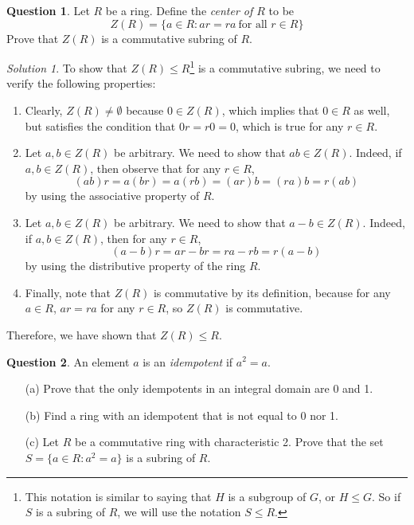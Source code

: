 \documentclass[11pt]{amsart}
\theoremstyle{definition}\newtheorem{question}{Question}
\theoremstyle{definition}\newtheorem{claim}{Claim}
\theoremstyle{remark}\newtheorem*{solution}{Solution}
\begin{document}
\newpage

\begin{question}
    Let $R$ be a ring. Define the \emph{center of $R$} to be
    \begin{equation*}
        Z(R) = \{a \in R : ar = ra \ \text{for all $r \in R$}\}
    \end{equation*}
    Prove that $Z(R)$ is a commutative subring of $R$.
\end{question}

\begin{solution}
    To show that $Z(R) \leq R$\footnote{This notation is similar to saying that $H$ is a subgroup of $G$, or $H \leq G$. So if $S$ is a subring of $R$, we will use the notation $S \leq R$.} is a commutative subring, we need to verify the following properties:
    \begin{enumerate}
        \item Clearly, $Z(R) \neq \emptyset$ because $0 \in Z(R)$, which implies that $0 \in R$ as well, but satisfies the condition that $0r = r0 = 0$, which is true for any $r \in R$.
        \item Let $a, b \in Z(R)$ be arbitrary. We need to show that $ab \in Z(R)$. Indeed, if $a, b \in Z(R)$, then observe that for any $r \in R$,
        \begin{equation*}
            (ab)r = a(br) = a(rb) = (ar)b = (ra)b = r(ab)
        \end{equation*}
        by using the associative property of $R$.
        \item Let $a, b \in Z(R)$ be arbitrary. We need to show that $a - b \in Z(R)$. Indeed, if $a, b \in Z(R)$, then for any $r \in R$,
        \begin{equation*}
            (a - b)r = ar - br = ra - rb = r(a - b)
        \end{equation*}
        by using the distributive property of the ring $R$.
        \item Finally, note that $Z(R)$ is commutative by its definition, because for any $a \in R$, $ar = ra$ for any $r \in R$, so $Z(R)$ is commutative.
    \end{enumerate}
    Therefore, we have shown that $Z(R) \leq R$.
\end{solution}

\newpage

\begin{question}
    An element $a$ is an \emph{idempotent} if $a^2 = a$.
    \begin{itemize}
        \item[(a)] Prove that the only idempotents in an integral domain are 0 and 1.
        \item[(b)] Find a ring with an idempotent that is not equal to 0 nor 1.
        \item[(c)] Let $R$ be a commutative ring with characteristic 2. Prove that the set $S = \{a \in R : a^2 = a\}$ is a subring of $R$.
    \end{itemize}
\end{question}
\end{document}

